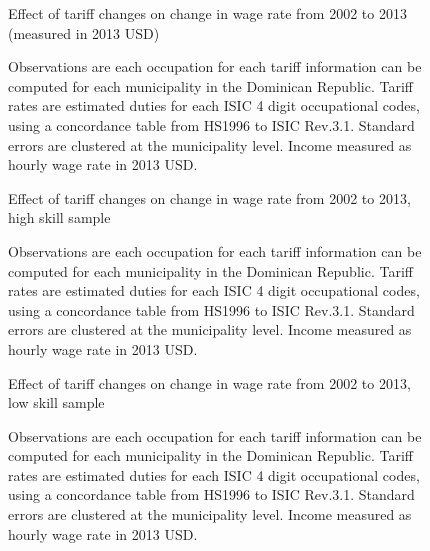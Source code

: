 \documentclass[12pt]{article}
\begin{document}
\begin{landscape}
\begin{figure}[H]
\begin{center}
Effect of tariff changes on change in wage rate from 2002 to 2013 (measured in 2013 USD)

\caption{\label{fig:Table2}}
\end{center}
Observations are each occupation for each tariff information can be computed for each municipality 
in the Dominican Republic. Tariff rates are estimated duties for each ISIC 4 %
digit occupational codes,
using a concordance table from HS1996 to ISIC Rev.3.1. Standard errors are clustered at the 
municipality level. Income measured as hourly wage rate in 2013 USD.
\end{figure}

\begin{figure}[H]
\begin{center}
Effect of tariff changes on change in wage rate from 2002 to 2013, high skill sample

\caption{\label{fig:Table4}}
\end{center}
Observations are each occupation for each tariff information can be computed for each municipality 
in the Dominican Republic. Tariff rates are estimated duties for each ISIC 4 %
digit occupational codes,
using a concordance table from HS1996 to ISIC Rev.3.1. Standard errors are clustered at the 
municipality level. Income measured as hourly wage rate in 2013 USD.
\end{figure}

\begin{figure}[H]
\begin{center}
Effect of tariff changes on change in wage rate from 2002 to 2013, low skill sample

\caption{\label{fig:Table5}}
\end{center}
Observations are each occupation for each tariff information can be computed for each municipality 
in the Dominican Republic. Tariff rates are estimated duties for each ISIC 4 %
digit occupational codes,
using a concordance table from HS1996 to ISIC Rev.3.1. Standard errors are clustered at the 
municipality level. Income measured as hourly wage rate in 2013 USD.
\end{figure}
\end{landscape}
\end{document}
